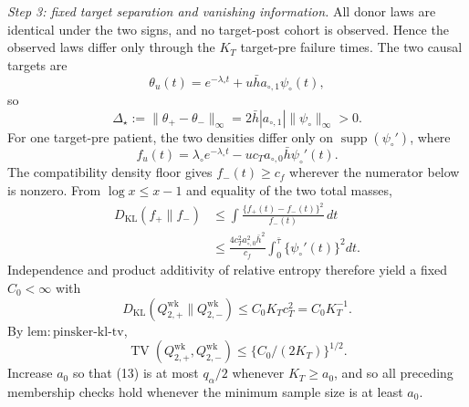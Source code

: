 \emph{Step 3: fixed target separation and vanishing information.}
All donor laws are identical under the two signs, and no target-post cohort is observed.  Hence the observed laws differ only through the \(K_T\) target-pre failure times.  The two causal targets are
\[
 \theta_u(t)=e^{-\lambda_\circ t}+u\bar h a_{\circ,1}\psi_\circ(t),
\]
so
\[
 \Delta_\star:=\|\theta_+-\theta_-\|_\infty
 =2\bar h|a_{\circ,1}|\|\psi_\circ\|_\infty>0.          \tag{9}
\]
For one target-pre patient, the two densities differ only on \(\operatorname{supp}(\psi_\circ')\), where
\[
 f_u(t)=\lambda_\circ e^{-\lambda_\circ t}
        -u c_Ta_{\circ,0}\bar h\psi_\circ'(t).           \tag{10}
\]
The compatibility density floor gives \(f_-(t)\ge c_f\) wherever the numerator below is nonzero.  From \(\log x\le x-1\) and equality of the two total masses,
\[
 \begin{aligned}
 D_{\mathrm{KL}}(f_+\|f_-)
 &\le\int\frac{\{f_+(t)-f_-(t)\}^2}{f_-(t)}\,dt\\
 &\le\frac{4c_T^2a_{\circ,0}^2\bar h^2}{c_f}
       \int_0^{\bar\tau}\{\psi_\circ'(t)\}^2dt.
 \end{aligned}                                             \tag{11}
\]
Independence and product additivity of relative entropy therefore yield a fixed \(C_0<\infty\) with
\[
 D_{\mathrm{KL}}(Q_{2,+}^{\mathrm{wk}}\|Q_{2,-}^{\mathrm{wk}})
 \le C_0K_Tc_T^2=C_0K_T^{-1}.                             \tag{12}
\]
By \(\mathrm{lem:pinsker\mbox{-}kl\mbox{-}tv}\),
\[
 \operatorname{TV}(Q_{2,+}^{\mathrm{wk}},Q_{2,-}^{\mathrm{wk}})
 \le\{C_0/(2K_T)\}^{1/2}.                                \tag{13}
\]
Increase \(a_0\) so that (13) is at most \(q_\alpha/2\) whenever \(K_T\ge a_0\), and so all preceding membership checks hold whenever the minimum sample size is at least \(a_0\).

